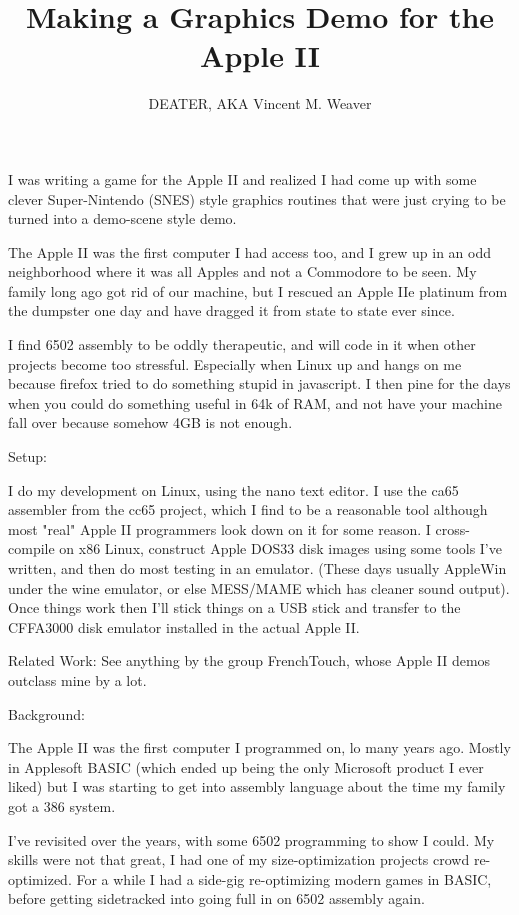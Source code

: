 \documentclass[twocolumn]{article}
\begin{document}
\title{Making a Graphics Demo for the Apple II}
\author{DEATER, AKA Vincent M. Weaver}

\maketitle

I was writing a game for the Apple II and realized I had come up with
some clever Super-Nintendo (SNES) style graphics routines that were just
crying to be turned into a demo-scene style demo.

The Apple II was the first computer I had access too, and I grew up in an odd
neighborhood where it was all Apples and not a Commodore to be seen.
My family long ago got rid of our machine, but I rescued an Apple IIe platinum
from the dumpster one day and have dragged it from state to state ever since.

I find 6502 assembly to be oddly therapeutic, and will code in it when other
projects become too stressful.  Especially when Linux up and hangs on me
because firefox tried to do something stupid in javascript.  I then pine for
the days when you could do something useful in 64k of RAM, and not have your
machine fall over because somehow 4GB is not enough.

Setup:

I do my development on Linux, using the nano text editor.  I use the
ca65 assembler from the cc65 project, which I find to be a reasonable
tool although most "real" Apple II programmers look down on it for some
reason.
I cross-compile on x86 Linux, construct Apple DOS33 disk images using
some tools I've written, and then do most testing in an emulator.
(These days usually AppleWin under the wine emulator, or else MESS/MAME
which has cleaner sound output).  Once things work then I'll stick things
on a USB stick and transfer to the CFFA3000 disk emulator installed in
the actual Apple II.

Related Work:
See anything by the group FrenchTouch, whose Apple II demos outclass
mine by a lot.


Background:

The Apple II was the first computer I programmed on, lo many years ago.
Mostly in Applesoft BASIC (which ended up being the only Microsoft product
I ever liked) but I was starting to get into assembly language about the
time my family got a 386 system.

I've revisited over the years, with some 6502 programming to show I could.
My skills were not that great, I had one of my size-optimization projects
crowd re-optimized.  For a while I had a side-gig re-optimizing modern games
in BASIC, before getting sidetracked into going full in on 6502 assembly
again.
\end{document}
